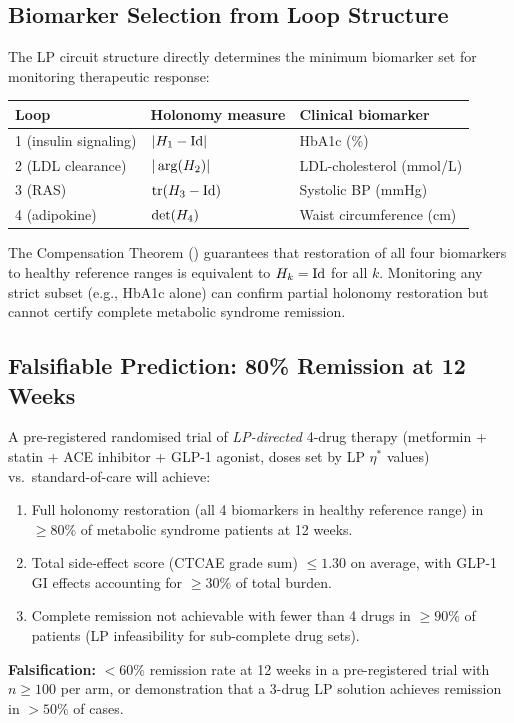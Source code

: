 \subsection{Biomarker Selection from Loop Structure}
\label{subsec:ch09-metsyn-biomarkers}

The LP circuit structure directly determines the minimum biomarker set for
monitoring therapeutic response:
\begin{center}
\begin{tabular}{lll}
\toprule
Loop & Holonomy measure & Clinical biomarker \\
\midrule
1 (insulin signaling) & $|H_1 - \mathrm{Id}|$ & HbA1c (\%) \\
2 (LDL clearance) & $|\arg(H_2)|$ & LDL-cholesterol (mmol/L) \\
3 (RAS) & $\mathrm{tr}(H_3 - \mathrm{Id})$ & Systolic BP (mmHg) \\
4 (adipokine) & $\det(H_4)$ & Waist circumference (cm) \\
\bottomrule
\end{tabular}
\end{center}

The Compensation Theorem () guarantees that
restoration of all four biomarkers to healthy reference ranges is equivalent
to $H_k = \mathrm{Id}$ for all $k$.  Monitoring any strict subset (e.g.,
HbA1c alone) can confirm partial holonomy restoration but cannot certify
complete metabolic syndrome remission.

\subsection{Falsifiable Prediction: 80\% Remission at 12 Weeks}
\label{subsec:ch09-metsyn-prediction}

\begin{prediction}
\label{pred:ch09-metsyn}
A pre-registered randomised trial of \emph{LP-directed} 4-drug therapy
(metformin + statin + ACE inhibitor + GLP-1 agonist, doses set by LP
$\eta^*$ values) vs.\ standard-of-care will achieve:
\begin{enumerate}[leftmargin=2em,label=(\roman*)]
  \item Full holonomy restoration (all 4 biomarkers in healthy reference
    range) in $\geq 80\%$ of metabolic syndrome patients at 12 weeks.
  \item Total side-effect score (CTCAE grade sum) $\leq 1.30$ on average,
    with GLP-1 GI effects accounting for $\geq 30\%$ of total burden.
  \item Complete remission not achievable with fewer than 4 drugs in $\geq
    90\%$ of patients (LP infeasibility for sub-complete drug sets).
\end{enumerate}
\textbf{Falsification:} $< 60\%$ remission rate at 12 weeks in a
pre-registered trial with $n \geq 100$ per arm, or demonstration that a
3-drug LP solution achieves remission in $> 50\%$ of cases.
\end{prediction}

